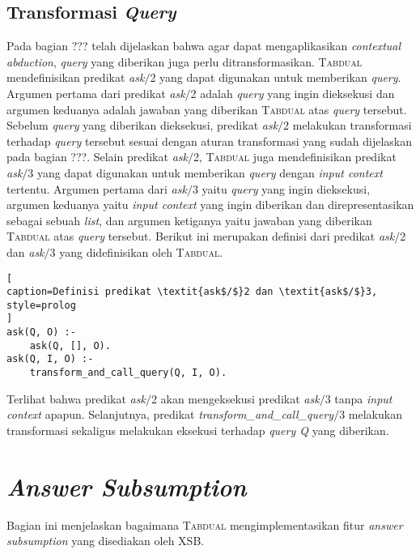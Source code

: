 \subsection{Transformasi \textit{Query}}

Pada bagian ??? telah dijelaskan bahwa agar dapat mengaplikasikan \textit{contextual abduction}, \textit{query} yang diberikan juga perlu ditransformasikan. \textsc{Tabdual} mendefinisikan predikat \textit{ask$/$}2 yang dapat digunakan untuk memberikan \textit{query}. Argumen pertama dari predikat \textit{ask$/$}2 adalah \textit{query} yang ingin dieksekusi dan argumen keduanya adalah jawaban yang diberikan \textsc{Tabdual} atas \textit{query} tersebut. Sebelum \textit{query} yang diberikan dieksekusi, predikat \textit{ask$/$}2 melakukan transformasi terhadap \textit{query} tersebut sesuai dengan aturan transformasi yang sudah dijelaskan pada bagian ???. Selain predikat \textit{ask$/$}2, \textsc{Tabdual} juga mendefinisikan predikat \textit{ask$/$}3 yang dapat digunakan untuk memberikan \textit{query} dengan \textit{input context} tertentu. Argumen pertama dari \textit{ask$/$}3 yaitu \textit{query} yang ingin dieksekusi, argumen keduanya yaitu \textit{input context} yang ingin diberikan dan direpresentasikan sebagai sebuah \textit{list}, dan argumen ketiganya yaitu jawaban yang diberikan \textsc{Tabdual} atas \textit{query} tersebut. Berikut ini merupakan definisi dari predikat \textit{ask$/$}2 dan \textit{ask$/$}3 yang didefinisikan oleh \textsc{Tabdual}.
\\

\begin{lstlisting}[
caption=Definisi predikat \textit{ask$/$}2 dan \textit{ask$/$}3,
style=prolog
]
ask(Q, O) :- 
	ask(Q, [], O).
ask(Q, I, O) :-
	transform_and_call_query(Q, I, O).
\end{lstlisting}

Terlihat bahwa predikat \textit{ask$/$}2 akan mengeksekusi predikat \textit{ask$/$}3 tanpa \textit{input context} apapun. Selanjutnya, predikat \textit{transform\_and\_call\_query$/$}3 melakukan transformasi sekaligus melakukan eksekusi terhadap \textit{query Q} yang diberikan.

\section{\textit{Answer Subsumption}}

Bagian ini menjelaskan bagaimana \textsc{Tabdual} mengimplementasikan fitur \textit{answer subsumption} yang disediakan oleh XSB.

